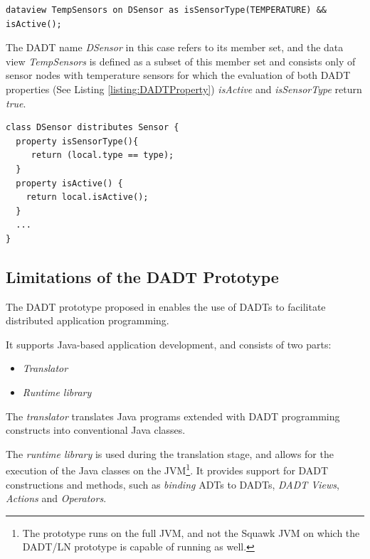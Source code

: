 \begin{lstlisting}[frame=trbl, basewidth={0.55em, 0.6em}, captionpos=b, 
basicstyle=\ttfamily\footnotesize, breaklines, caption = Definition of DADT Data View, label = listing:DADTview ]  
dataview TempSensors on DSensor as isSensorType(TEMPERATURE) && isActive(); 
\end{lstlisting}

The DADT name \emph{DSensor} in this case refers to its member set, and 
the data view \emph{TempSensors} is defined as a subset of this member set and
consists only of sensor nodes with temperature sensors for which the evaluation of
both DADT properties (See Listing \ref{listing:DADTProperty}) \emph{isActive}
and \emph{isSensorType} return \emph{true}. 

\begin{lstlisting}[frame=trbl, basewidth={0.55em, 0.6em}, captionpos=b, 
basicstyle=\ttfamily\footnotesize, breaklines, caption = Definition of DADT Properties, label = listing:DADTProperty ]  
class DSensor distributes Sensor {
  property isSensorType(){
	 return (local.type == type);
  }
  property isActive() {
	return local.isActive();
  }
  ...
}

\end{lstlisting}


\subsection{Limitations of the DADT Prototype}

The DADT prototype proposed in \cite{migliavacca_DADT:2006} enables the use of
DADTs to facilitate distributed application programming.

It supports Java-based application development, and consists of two parts:
\begin{itemize}
  \item \emph{Translator}
  \item \emph{Runtime library} 
\end{itemize}

The \emph{translator} translates Java programs
  extended with DADT programming constructs into conventional Java classes.

The \emph{runtime library} is used during the translation stage, and allows for the execution of the Java classes on the JVM\footnote{The prototype runs on the full JVM, and not the Squawk JVM on which the DADT/LN prototype is capable of running as well.}. It provides support for DADT constructions and methods, such as
\emph{binding} ADTs to DADTs, \emph{DADT Views}, \emph{Actions} and
\emph{Operators}. 

